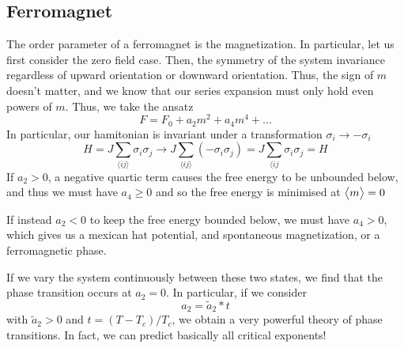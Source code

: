 \subsection{Ferromagnet}
The order parameter of a ferromagnet is the magnetization. In particular, let us first consider the zero field case. Then, the symmetry of the system invariance regardless of upward orientation or downward orientation. Thus, the sign of \(m\) doesn't matter, and we know that our series expansion must only hold even powers of \(m\). Thus, we take the ansatz
\begin{equation}
	F = F_0 + a_2m^2+a_4m^4+\dots
\end{equation}
In particular, our hamitonian is invariant under a transformation \(\sigma_i\to-\sigma_i\)
\[H = J\sum_{\langle ij\rangle} \sigma_i\sigma_j\to J\sum_{\langle ij \rangle} (-\sigma_i\sigma_j) = J\sum_{\langle ij }\sigma_i\sigma_j = H\]
If \(a_2>0\), a negative quartic term causes the free energy to be unbounded below, and thus we must have \(a_4\geq0\) and so the free energy is minimised at \(\left\langle \begin{matrix}m\end{matrix} \right\rangle=0\)

If instead \(a_2<0\) to keep the free energy bounded below, we must have \(a_4>0\), which gives us a mexican hat potential, and spontaneous magnetization, or a ferromagnetic phase.

If we vary the system continuously between these two states, we find that the phase transition occurs at \(a_2 = 0\). In particular, if we consider
\begin{equation}
	a_2 = \tilde a_2 * t
\end{equation}
with \(\tilde a_2>0\) and \(t = (T-T_c)/T_c\), we obtain a very powerful theory of phase transitions. In fact, we can predict basically all critical exponents!

